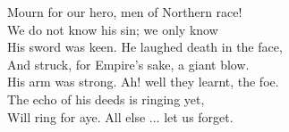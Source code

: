 \begin{poemblock}
Mourn for our hero, men of Northern race!\\
\hspace*{3em}We do not know his sin; we only know\\
His sword was keen. He laughed death in the face,\\
\hspace*{3em}And struck, for Empire's sake, a giant blow.\\
\hspace*{3em}His arm was strong. Ah! well they learnt, the foe.\\
The echo of his deeds is ringing yet,\\
Will ring for aye. All else ... let us forget.

\end{poemblock}

